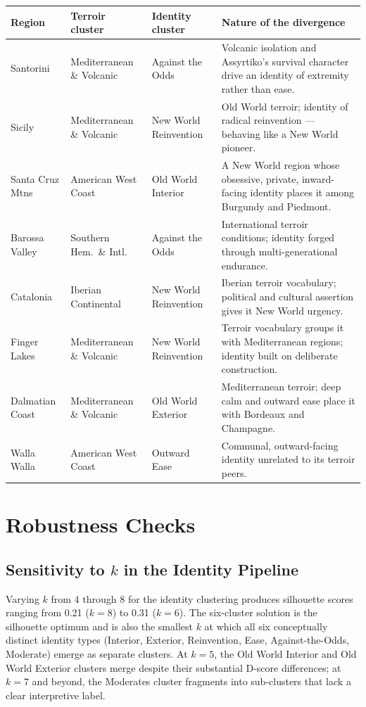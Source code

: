 \documentclass[11pt]{article}
\begin{document}
\begin{center}
\begin{tabular}{@{}lllp{6.8cm}@{}}
\toprule
Region & Terroir cluster & Identity cluster & Nature of the divergence \\
\midrule
Santorini   & Mediterranean \& Volcanic  & Against the Odds      & Volcanic isolation and Assyrtiko's survival character drive an identity of extremity rather than ease. \\
Sicily      & Mediterranean \& Volcanic  & New World Reinvention & Old World terroir; identity of radical reinvention --- behaving like a New World pioneer. \\
Santa Cruz Mtns & American West Coast    & Old World Interior    & A New World region whose obsessive, private, inward-facing identity places it among Burgundy and Piedmont. \\
Barossa Valley & Southern Hem.\ \& Intl. & Against the Odds      & International terroir conditions; identity forged through multi-generational endurance. \\
Catalonia   & Iberian Continental         & New World Reinvention & Iberian terroir vocabulary; political and cultural assertion gives it New World urgency. \\
Finger Lakes & Mediterranean \& Volcanic & New World Reinvention & Terroir vocabulary groups it with Mediterranean regions; identity built on deliberate construction. \\
Dalmatian Coast & Mediterranean \& Volcanic & Old World Exterior & Mediterranean terroir; deep calm and outward ease place it with Bordeaux and Champagne. \\
Walla Walla & American West Coast        & Outward Ease          & Communal, outward-facing identity unrelated to its terroir peers. \\
\bottomrule
\end{tabular}
\end{center}

\section{Robustness Checks}

\subsection{Sensitivity to $k$ in the Identity Pipeline}
Varying $k$ from 4 through 8 for the identity clustering produces silhouette scores ranging from 0.21 ($k = 8$) to 0.31 ($k = 6$). The six-cluster solution is the silhouette optimum and is also the smallest $k$ at which all six conceptually distinct identity types (Interior, Exterior, Reinvention, Ease, Against-the-Odds, Moderate) emerge as separate clusters. At $k = 5$, the Old World Interior and Old World Exterior clusters merge despite their substantial D-score differences; at $k = 7$ and beyond, the Moderates cluster fragments into sub-clusters that lack a clear interpretive label.
\end{document}
